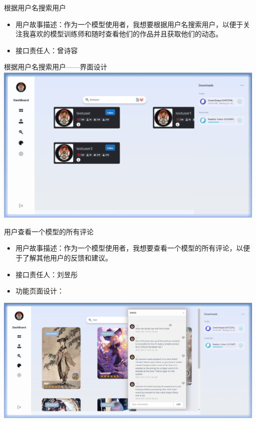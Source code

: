 \begin{frame}{根据用户名搜索用户}
    \begin{itemize}
        \item 用户故事描述：作为一个模型使用者，我想要根据用户名搜索用户，以便于关注我喜欢的模型训练师和随时查看他们的作品并且获取他们的动态。
        \item 接口责任人：曾诗容
    \end{itemize}
\end{frame}

\begin{frame}{根据用户名搜索用户——界面设计}
    \includegraphics[width=1\textwidth]{contents/figure/search_user.png}
\end{frame}

\begin{frame}{用户查看一个模型的所有评论}
    \begin{itemize}
        \item 用户故事描述：作为一个模型使用者，我想要查看一个模型的所有评论，以便于了解其他用户的反馈和建议。
        \item 接口责任人：刘昱彤
        \item 功能页面设计： 
    \end{itemize}
\end{frame}

\begin{frame}
    \includegraphics[width=1\textwidth]{contents/figure/comment_search.png}
\end{frame}

